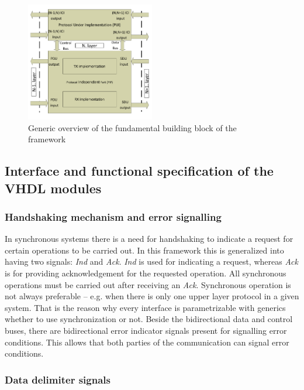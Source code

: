 \documentclass[conference]{IEEEtran}
\begin{document}
\begin{figure}[!htb]
    \centering
    \includegraphics[width=0.5\textwidth]{figures_raw/system_sketch.pdf}
    \caption{Generic overview of the fundamental building block of the framework}
    \label{fig:system_sketch}
\end{figure}

\subsection{Interface and functional specification of the VHDL modules}\label{subsec:if_and_func_spec_VHDL}

\subsubsection{Handshaking mechanism and error signalling}
In synchronous systems there is a need for handshaking to indicate a request for certain operations to be carried out. In this framework this is generalized into having two signals: \emph{Ind} and \emph{Ack}.
\emph{Ind} is used for indicating a request, whereas \emph{Ack} is for providing acknowledgement for
the requested operation. All synchronous operations must be carried out after receiving an \emph{Ack}.
Synchronous operation is not always preferable -- e.g. when there is only one upper layer protocol in a
given system. That is the reason why every interface is parametrizable with generics whether to use
synchronization or not.
Beside the bidirectional data and control buses, there are bidirectional error indicator signals present
for signalling error conditions. This allows that both parties of the communication can signal error conditions.

\subsubsection{Data delimiter signals}
\end{document}
